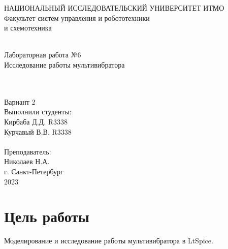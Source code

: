 \documentclass[12pt]{article}
\begin{document}
\begin{titlepage}
\begin{center}
    {\small НАЦИОНАЛЬНЫЙ ИССЛЕДОВАТЕЛЬСКИЙ УНИВЕРСИТЕТ ИТМО} \\
    {\small Факультет систем управления и робототехники} \\
    \vspace*{10\baselineskip}
    { и схемотехника} \\
    \ \\
    \begin{spacing}{1.5}
    {\large Лабораторная работа №6 \\
    Исследование работы мультивибратора} \\
    \end{spacing} \\
    \ \\
    Вариант 2 \\
    \vspace*{10\baselineskip}
    \hfill {Выполнили студенты:} \\
    \hfill {Кирбаба Д.Д. R3338} \\
    \hfill {Курчавый В.В. R3338} \\
    \ \\
    \hfill {Преподаватель:} \\
    \hfill {Николаев Н.А.} \\
    \mbox{}
    \vfill {г. Санкт-Петербург\\2023}
\end{center}
\end{titlepage}

\section*{Цель работы}
Моделирование и исследование работы мультивибратора в LtSpice.
\end{document}
